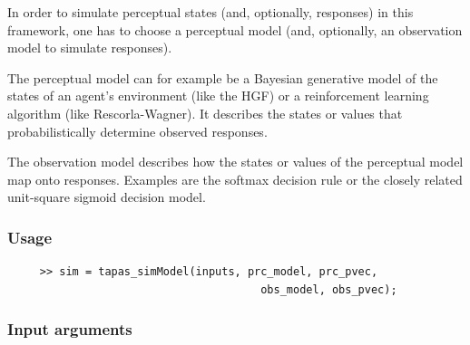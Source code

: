 \documentclass[11pt,a4paper]{article}
\numberwithin{equation}{section}
\begin{document}
In order to simulate perceptual states (and, optionally, responses) in
this framework, one has to choose a perceptual model (and, optionally,
an observation model to simulate responses).

The perceptual model can for example be a Bayesian generative model of
the states of an agent's environment (like the HGF) or a reinforcement
learning algorithm (like Rescorla-Wagner). It describes the
states or values that probabilistically determine observed responses.

The observation model describes how the states or values of the
perceptual model map onto responses. Examples are the softmax decision
rule or the closely related unit-square sigmoid decision model.

\subsubsection{Usage}

\begin{verbatim}
     >> sim = tapas_simModel(inputs, prc_model, prc_pvec,
                                       obs_model, obs_pvec);
\end{verbatim}

\subsubsection{Input arguments} 
\end{document}
